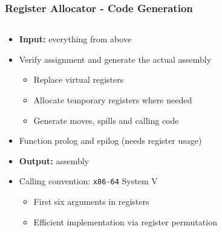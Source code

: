 \documentclass[navbaroff,en]{sdqbeamer}
\begin{document}
\begin{frame}
\frametitle{Register Allocator - Code Generation}

\begin{columns}
	\begin{column}{0.65\textwidth}
		\begin{itemize}
			\item \textbf{Input:} everything from above
			\item Verify assignment and generate the actual assembly
			\begin{itemize}
				\item Replace virtual registers
				\item Allocate temporary registers where needed
				\item Generate moves, spills and calling code
			\end{itemize}
			\item Function prolog and epilog (needs register usage)
			\item \textbf{Output:} assembly
		\end{itemize}
	
		\vspace{10pt}
		\begin{itemize}
			\item Calling convention: \texttt{x86-64} System V
			\begin{itemize}
				\item First six arguments in registers
				\item Efficient implementation via register permutation
			\end{itemize}
		\end{itemize}
	\end{column}
	

\end{columns}
\end{frame}
\end{document}
